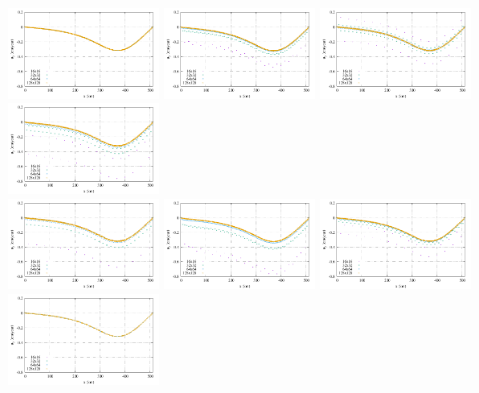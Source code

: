 \newpage
\begin{center}
\includegraphics[width=4cm]{python_codes/fieldstone_78/results/exp08/vel_profile_topo0_full.pdf}
\includegraphics[width=4cm]{python_codes/fieldstone_78/results/exp08/vel_profile_topo1_full.pdf}
\includegraphics[width=4cm]{python_codes/fieldstone_78/results/exp08/vel_profile_topo2_full.pdf}
\includegraphics[width=4cm]{python_codes/fieldstone_78/results/exp08/vel_profile_topo3_full.pdf}\\
\includegraphics[width=4cm]{python_codes/fieldstone_78/results/exp08/vel_profile_topo4_full.pdf}
\includegraphics[width=4cm]{python_codes/fieldstone_78/results/exp08/vel_profile_topo5_full.pdf}
\includegraphics[width=4cm]{python_codes/fieldstone_78/results/exp08/vel_profile_topo6_full.pdf}
\includegraphics[width=4cm]{python_codes/fieldstone_78/results/exp08/vel_profile_topo7_full.pdf}
\end{center}


